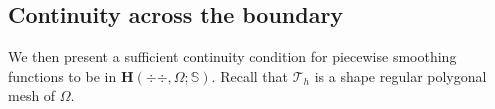%


\subsection{Continuity across the boundary}
We then present a sufficient continuity condition for piecewise smoothing functions to be in $\boldsymbol{H}(\div{\div },\Omega; \mathbb{S})$. Recall that $\mathcal {T}_h$ is a shape regular polygonal mesh of $\Omega$.

